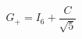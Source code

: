 \setcounter{equation}{38}
\begin{equation}
 G_+=I_6+\frac{C}{\sqrt5}
\label{eq:sixaxisgram}
\end{equation}
